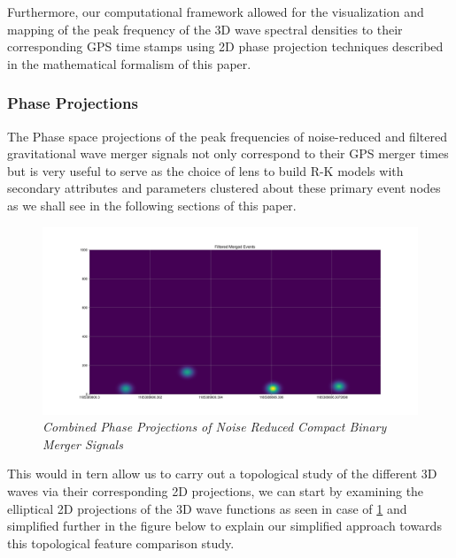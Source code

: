     Furthermore, our computational framework allowed for the visualization and mapping of the peak frequency of the 3D wave spectral densities to their corresponding GPS time stamps using 2D phase projection techniques described in the mathematical formalism of this paper.

    \subsubsection{Phase Projections}

    The Phase space projections of the peak frequencies of noise-reduced and filtered gravitational wave merger signals not only correspond to their GPS merger times but is very useful to serve as the choice of lens to build R-K models with  secondary attributes and parameters clustered about these primary event nodes as we shall see in the following sections of this paper.
    \begin{figure}[H]
        \centering
        \includegraphics[width=1.0\linewidth]{images/50_07_Phase Projections of Noise Reduced Topological Merger Signals.png}
        \caption{\textit{Combined Phase Projections of Noise Reduced Compact Binary Merger Signals}}
        \label{fig:2D_Phase_Space_Projections}
    \end{figure}
    
This would in tern allow us to carry out a topological study of the different 3D waves via their corresponding 2D projections, we can start by examining the elliptical 2D projections of the 3D wave functions as seen in case of \ref{fig:2D_Phase_Space_Projections} and simplified further in the figure below to explain our simplified approach towards this topological feature comparison study.

